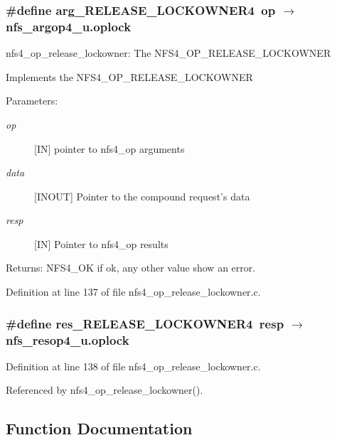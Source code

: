 \subsubsection{\setlength{\rightskip}{0pt plus 5cm}\#define arg\_\-RELEASE\_\-LOCKOWNER4\ op $\rightarrow$ nfs\_\-argop4\_\-u.oplock}\label{nfs4__op__release__lockowner_8c_a0}


nfs4\_\-op\_\-release\_\-lockowner: The NFS4\_\-OP\_\-RELEASE\_\-LOCKOWNER

Implements the NFS4\_\-OP\_\-RELEASE\_\-LOCKOWNER

\begin{Desc}
\item[Parameters:]
\begin{description}
\item[{\em op}][IN] pointer to nfs4\_\-op arguments \item[{\em data}][INOUT] Pointer to the compound request's data \item[{\em resp}][IN] Pointer to nfs4\_\-op results\end{description}
\end{Desc}
\begin{Desc}
\item[Returns:]NFS4\_\-OK if ok, any other value show an error. \end{Desc}


Definition at line 137 of file nfs4\_\-op\_\-release\_\-lockowner.c.
\subsubsection{\setlength{\rightskip}{0pt plus 5cm}\#define res\_\-RELEASE\_\-LOCKOWNER4\ resp $\rightarrow$ nfs\_\-resop4\_\-u.oplock}\label{nfs4__op__release__lockowner_8c_a1}




Definition at line 138 of file nfs4\_\-op\_\-release\_\-lockowner.c.

Referenced by nfs4\_\-op\_\-release\_\-lockowner().

\subsection{Function Documentation}
